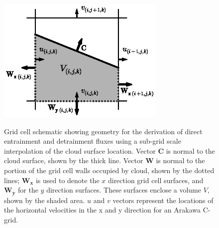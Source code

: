 \documentclass[12pt]{article}
\begin{document}
\begin{figure}[t]
  \noindent
  \includegraphics[width=19pc,angle=0]{./figures/gridcell_schematic}\\
  \caption{Grid cell schematic showing geometry for the derivation of direct 
entrainment and detrainment fluxes using a sub-grid scale interpolation of the 
cloud surface location.  Vector $\mathbf{C}$ is normal to the cloud surface, 
shown by the thick line.  Vector $\mathbf{W}$ is normal to the portion of the 
grid cell walls occupied by cloud, shown by the dotted lines; $\mathbf{W_x}$ is 
used to denote the $x$ direction grid cell surfaces, and $\mathbf{W_y}$ for the 
$y$ direction surfaces.  These surfaces enclose a volume $V$, shown by the 
shaded area.  $u$ and $v$ vectors represent the locations of the horizontal 
velocities in the x and y direction for an Arakawa C-grid.}
  \label{fig:gridcell_schematic}
\end{figure}
\end{document}
